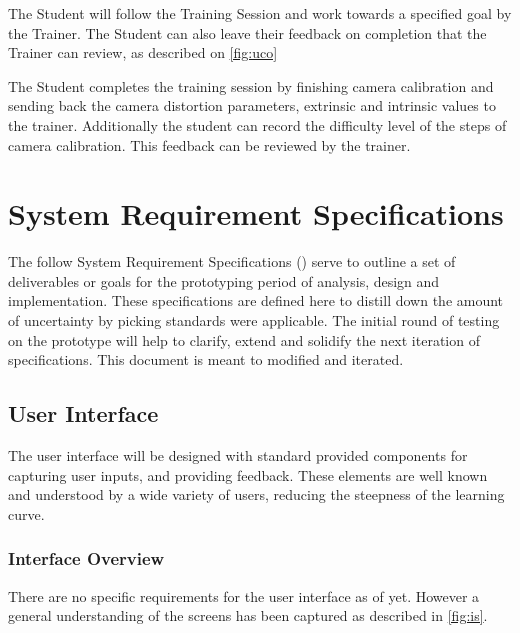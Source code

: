 \documentclass[11pt]{report}
\begin{document}
    The Student will follow the Training Session and work towards a specified goal by the Trainer. The Student can also leave their feedback on completion that the Trainer can review, as described on \ref{fig:uco}

    The Student completes the training session by finishing camera calibration and sending back the camera distortion parameters, extrinsic and intrinsic values to the trainer. Additionally the student can record the difficulty level of the steps of camera calibration. This feedback can be reviewed by the trainer.  


\chapter{System Requirement Specifications}



The follow System Requirement Specifications () serve to outline a set of deliverables or goals for the prototyping period of analysis, design and implementation. These specifications are defined here to distill down the amount of uncertainty by picking standards were applicable. The initial round of testing on the prototype will help to clarify, extend and solidify the next iteration of specifications. This document is meant to modified and iterated.  

\section{User Interface} 

The user interface will be designed with standard  provided components for capturing user inputs, and providing feedback. These elements are well known and understood by a wide variety of users, reducing the steepness of the learning curve.

\subsection{Interface Overview}

There are no specific requirements for the user interface as of yet. However a general understanding of the screens has been captured as described in \ref{fig:is}. 
\end{document}
